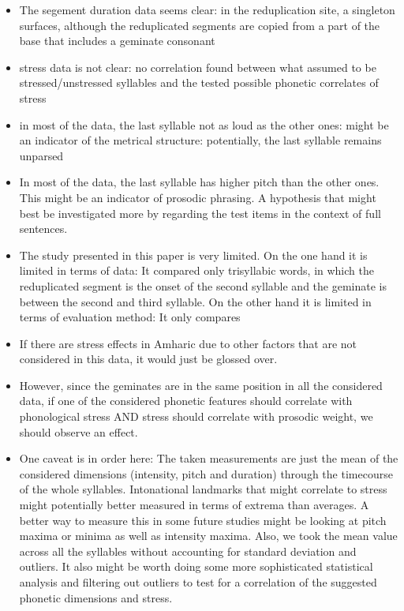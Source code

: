 \documentclass[12pt]{article}
\begin{document}
\begin{itemize}
	\item The segement duration data seems clear: in the reduplication site, a singleton surfaces, although the reduplicated segments are copied from a part of the base that includes a geminate consonant

	\item stress data is not clear: no correlation found between what \cite{sande-hedding14} assumed to be stressed/unstressed syllables and the tested possible phonetic correlates of stress

	\item in most of the data, the last syllable not as loud as the other ones: might be an indicator of the metrical structure: potentially, the last syllable remains unparsed

	\item In most of the data, the last syllable has higher pitch than the other ones. This might be an indicator of prosodic phrasing. A hypothesis that might best be investigated more by regarding the test items in the context of full sentences.

	\item The study presented in this paper is very limited. On the one hand it is limited in terms of data: It compared only trisyllabic words, in which the reduplicated segment is the onset of the second syllable and the geminate is between the second and third syllable. On the other hand it is limited in terms of evaluation method: It only compares 

	\item If there are stress effects in Amharic due to other factors that are not considered in this data, it would just be glossed over. 

	\item However, since the geminates are in the same position in all the considered data, if one of the considered phonetic features should correlate with phonological stress AND stress should correlate with prosodic weight, we should observe an effect. 

	\item One caveat is in order here: The taken measurements are just the mean of the considered dimensions (intensity, pitch and duration) through the timecourse of the whole syllables. Intonational landmarks that might correlate to stress might potentially better measured in terms of extrema than averages. A better way to measure this in some future studies might be looking at pitch maxima or minima as well as intensity maxima. Also, we took the mean value across all the syllables without accounting for standard deviation and outliers. It also might be worth doing some more sophisticated statistical analysis and filtering out outliers to test for a correlation of the suggested phonetic dimensions and stress.


\end{itemize}
\end{document}
